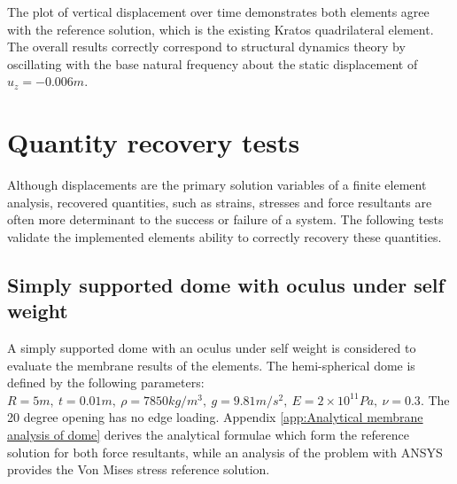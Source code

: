  The plot of vertical displacement over time demonstrates both elements agree with the reference solution, which is the existing Kratos quadrilateral element. The overall results correctly correspond to structural dynamics theory by oscillating with the base natural frequency about the static displacement of $u_z=-0.006m$.

\section{Quantity recovery tests}

Although displacements are the primary solution variables of a finite element analysis, recovered quantities, such as strains, stresses and force resultants are often more determinant to the success or failure of a system. The following tests validate the implemented elements ability to correctly recovery these quantities.

\subsection{Simply supported dome with oculus under self weight}
\label{subsection:dome_test}

A simply supported dome with an oculus under self weight is considered to evaluate the membrane results of the elements. The hemi-spherical dome is defined by the following parameters: $R = 5m,\ t = 0.01m,\ \rho = 7850 kg/m^3,\ g = 9.81m/s^2,\ E = 2 \times 10^{11} Pa,\ \nu = 0.3$. The 20 degree opening has no edge loading. Appendix \ref{app:Analytical membrane analysis of dome} derives the analytical formulae which form the reference solution for both force resultants, while an analysis of the problem with ANSYS provides the Von Mises stress reference solution.

